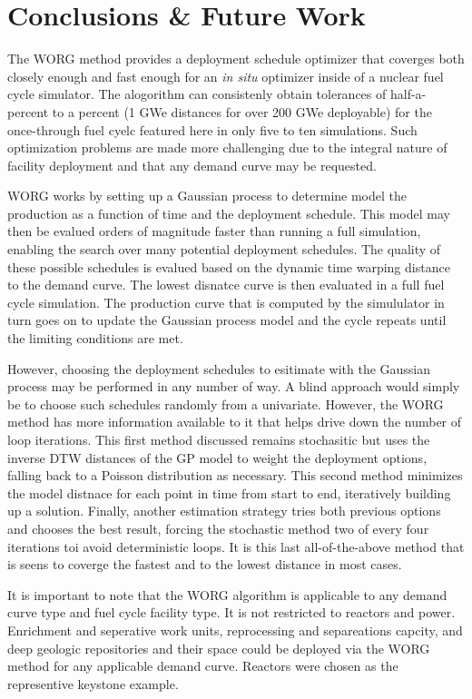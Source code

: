 \section{Conclusions \& Future Work}
\label{conclusion}

The WORG method provides a deployment schedule optimizer that coverges 
both closely enough and fast enough for an \emph{in situ} optimizer inside
of a nuclear fuel cycle simulator. The alogorithm can consistenly obtain
tolerances of half-a-percent to a percent (1 GWe distances for over 200 GWe
deployable) for the once-through fuel cyelc featured here in only five to 
ten simulations. Such optimization problems are made
more challenging due to the integral nature of facility deployment and
that any demand curve may be requested.

WORG works by setting up a Gaussian process to determine model the production
as a function of time and the deployment schedule. This model may then
be evalued orders of magnitude faster than running a full simulation, enabling
the search over many potential deployment schedules. The quality of these
possible schedules is evalued based on the dynamic time warping distance
to the demand curve. The lowest disnatce curve is then evaluated in a
full fuel cycle simulation. The production curve that is computed by the 
simululator in turn goes on to update the Gaussian process model and the
cycle repeats until the limiting conditions are met.

However, choosing the deployment schedules to esitimate with the Gaussian
process may be performed in any number of way. A blind approach would
simply be to choose such schedules randomly from a univariate. However, 
the WORG method has more information available to it that helps drive 
down the number of loop iterations. This first method discussed remains 
stochasitic but uses the inverse DTW distances of the GP model to 
weight the deployment options, falling back to a Poisson distribution as 
necessary. This second method minimizes the model distnace for each point 
in time from start to end, iteratively building up a solution. Finally, 
another estimation strategy tries both previous options and chooses the 
best result, forcing the stochastic method two of every four iterations 
toi avoid deterministic loops.  It is this last all-of-the-above method 
that is seens to coverge the fastest and to the lowest distance in most 
cases.

It is important to note that the WORG algorithm is applicable to any 
demand curve type and fuel cycle facility type. It is not restricted to 
reactors and power.  Enrichment and seperative work units, reprocessing
and separeations capcity, and deep geologic repositories and their
space could be deployed via the WORG method for any applicable demand 
curve.  Reactors were chosen as the representive keystone example.

